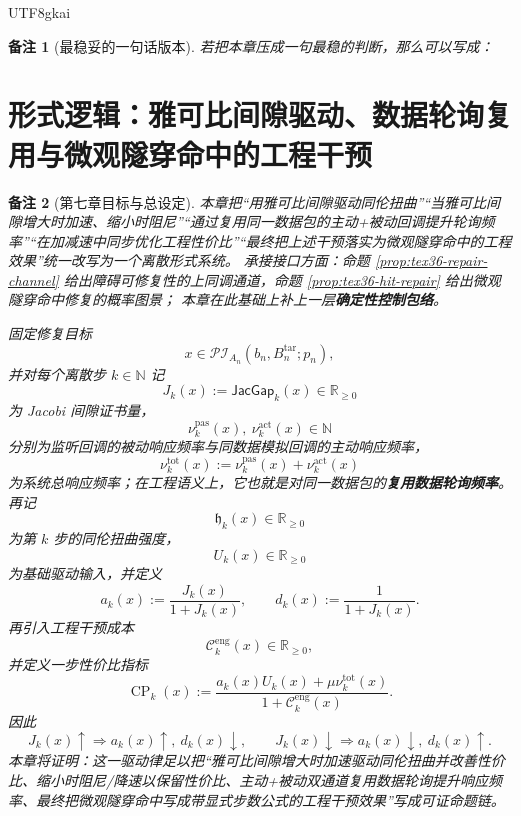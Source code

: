 \documentclass[12pt]{article}
\newtheorem{remark}{备注}[section]
\newcommand{\NN}{\mathbb{N}}
\newcommand{\RR}{\mathbb{R}}
\begin{document}
\begin{CJK*}{UTF8}{gkai}
\begin{remark}[最稳妥的一句话版本]
若把本章压成一句最稳的判断，那么可以写成：
\begin{center}
\end{center}
\end{remark}

\section{形式逻辑：雅可比间隙驱动、数据轮询复用与微观隧穿命中的工程干预}
\label{sec:tex36-ch7}

\begin{remark}[第七章目标与总设定]
本章把“用雅可比间隙驱动同伦扭曲”“当雅可比间隙增大时加速、缩小时阻尼”“通过复用同一数据包的主动+被动回调提升轮询频率”“在加减速中同步优化工程性价比”“最终把上述干预落实为微观隧穿命中的工程效果”统一改写为一个离散形式系统。
承接接口方面：命题 \ref{prop:tex36-repair-channel} 给出障碍可修复性的上同调通道，命题 \ref{prop:tex36-hit-repair} 给出微观隧穿命中修复的概率图景；
  本章在此基础上补上一层\textbf{确定性控制包络}。

固定修复目标
\[
  x\in \mathcal{PI}_{A_n}(b_n,B_n^{\mathrm{tar}};p_n),
\]
并对每个离散步 $k\in\NN$ 记
\[
  J_k(x):=\mathsf{JacGap}_k(x)\in \RR_{\ge 0}
\]
为 Jacobi 间隙证书量，
\[
  \nu_k^{\mathrm{pas}}(x),\ \nu_k^{\mathrm{act}}(x)\in\NN
\]
分别为监听回调的被动响应频率与同数据模拟回调的主动响应频率，
\[
  \nu_k^{\mathrm{tot}}(x):=\nu_k^{\mathrm{pas}}(x)+\nu_k^{\mathrm{act}}(x)
\]
为系统总响应频率；在工程语义上，它也就是对同一数据包的\textbf{复用数据轮询频率}。
再记
\[
  \mathfrak h_k(x)\in \RR_{\ge 0}
\]
为第 $k$ 步的同伦扭曲强度，
\[
  U_k(x)\in \RR_{\ge 0}
\]
为基础驱动输入，并定义
\[
  a_k(x):=\frac{J_k(x)}{1+J_k(x)},
  \qquad
  d_k(x):=\frac{1}{1+J_k(x)}.
\]
再引入工程干预成本
\[
  \mathcal C_k^{\mathrm{eng}}(x)\in \RR_{\ge 0},
\]
并定义一步性价比指标
\[
  \operatorname{CP}_k(x)
  :=
  \frac{
    a_k(x)U_k(x)+\mu \nu_k^{\mathrm{tot}}(x)
  }{
    1+\mathcal C_k^{\mathrm{eng}}(x)
  }.
\]
因此
\[
  J_k(x)\uparrow \Longrightarrow a_k(x)\uparrow,\ d_k(x)\downarrow,
  \qquad
  J_k(x)\downarrow \Longrightarrow a_k(x)\downarrow,\ d_k(x)\uparrow.
\]
本章将证明：这一驱动律足以把“雅可比间隙增大时加速驱动同伦扭曲并改善性价比、缩小时阻尼/降速以保留性价比、主动+被动双通道复用数据轮询提升响应频率、最终把微观隧穿命中写成带显式步数公式的工程干预效果”写成可证命题链。
\end{remark}


\end{CJK*}
\end{document}
